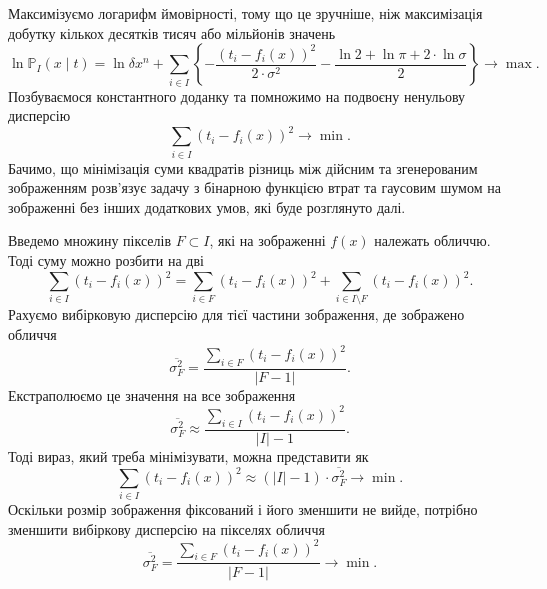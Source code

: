Максимізуємо логарифм ймовірності,
тому що це зручніше,
ніж максимізація добутку кількох десятків тисяч або мільйонів значень
\begin{equation*}
  \ln{\mathbb{P}_I\left( x \mid t \right)}
  = \ln{\delta x^n} + \sum_{i \in I}
    \left\{
      - \frac{\left( t_i - f_i\left( x \right) \right)^2}{2 \cdot \sigma^2}
      - \frac{\ln{2} + \ln{\pi} + 2 \cdot \ln{\sigma}}{2}
    \right\}
  \to \max.
\end{equation*}
Позбуваємося константного доданку та помножимо на подвоєну ненульову дисперсію
\begin{equation*}
  \sum_{i \in I} \left( t_i - f_i\left( x \right) \right)^2 \to \min.
\end{equation*}
Бачимо,
що мінімізація суми квадратів різниць між дійсним та згенерованим зображенням
розв'язує задачу з бінарною функцією втрат
та гаусовим шумом на зображенні без інших додаткових умов,
які буде розглянуто далі.

Введемо множину пікселів $F \subset I$,
які на зображенні $f\left( x \right)$ належать обличчю.
Тоді суму можно розбити на дві
\begin{equation*}
  \sum_{i \in I} \left( t_i - f_i\left( x \right) \right)^2
  = \sum_{i \in F} \left( t_i - f_i\left( x \right) \right)^2
  + \sum_{i \in I \setminus F} \left( t_i - f_i\left( x \right) \right)^2.
\end{equation*}
Рахуємо вибірковую дисперсію для тієї частини зображення,
де зображено обличчя
\begin{equation*}
  \overline{\sigma_F^2}
  = \frac{\sum\limits_{i \in F} \left( t_i - f_i\left( x \right) \right)^2}
    {\left| F - 1 \right|}.
\end{equation*}
Екстраполюємо це значення на все зображення
\begin{equation*}
  \overline{\sigma_F^2}
  \approx \frac{\sum\limits_{i \in I}
             \left( t_i - f_i\left( x \right) \right)^2}
            {\left| I \right| - 1}.
\end{equation*}
Тоді вираз, який треба мінімізувати, можна представити як
\begin{equation*}
  \sum_{i \in I} \left( t_i - f_i\left( x \right) \right)^2
  \approx \left( \left| I \right| - 1 \right) \cdot \overline{\sigma_F^2}
  \to \min.
\end{equation*}
Оскільки розмір зображення фіксований і його зменшити не вийде,
потрібно зменшити вибіркову дисперсію на пікселях обличчя
\begin{equation*}
  \overline{\sigma_F^2}
  = \frac{\sum\limits_{i \in F} \left( t_i - f_i\left( x \right) \right)^2}
         {\left| F - 1 \right|}
  \to \min.
\end{equation*}

